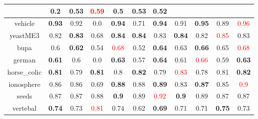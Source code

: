 \documentclass{article}%
\begin{document}
\begin{tabular}{c|cccccccccc}
{}&0.2&\textbf{0.53}&\textcolor{red}{ 
0.59
}&0.5&\textbf{0.53}&0.52\\%
\hline%
vehicle&\textbf{0.93}&0.92&0.0&\textbf{0.94}&0.71&\textbf{0.94}&0.91&\textbf{0.95}&0.89&\textcolor{red}{ 
0.96
}\\%
\hline%
yeastME3&0.82&\textbf{0.83}&0.68&\textbf{0.84}&\textbf{0.84}&0.83&\textbf{0.84}&0.82&\textcolor{red}{ 
0.85
}&0.83\\%
\hline%
bupa&0.6&\textbf{0.62}&0.54&\textcolor{red}{ 
0.68
}&0.52&\textbf{0.64}&0.63&\textbf{0.66}&0.65&\textcolor{red}{ 
0.68
}\\%
\hline%
german&\textbf{0.61}&0.6&0.0&\textbf{0.63}&0.57&\textbf{0.64}&0.61&\textcolor{red}{ 
0.66
}&0.59&\textbf{0.63}\\%
\hline%
horse\_colic&\textbf{0.81}&0.79&\textbf{0.81}&0.8&\textbf{0.82}&0.79&\textcolor{red}{ 
0.83
}&0.78&0.81&\textbf{0.82}\\%
\hline%
ionosphere&0.86&0.86&0.69&\textbf{0.88}&0.88&\textbf{0.89}&0.83&\textbf{0.87}&0.85&\textcolor{red}{ 
0.9
}\\%
\hline%
seeds&0.87&0.87&0.88&\textbf{0.9}&0.89&\textcolor{red}{ 
0.92
}&\textbf{0.9}&0.89&0.87&0.87\\%
\hline%
vertebal&\textbf{0.74}&0.73&\textcolor{red}{ 
0.81
}&0.74&0.62&\textbf{0.69}&0.71&0.71&\textbf{0.75}&0.73\\%
\hline%
\end{tabular}

%
\end{document}
